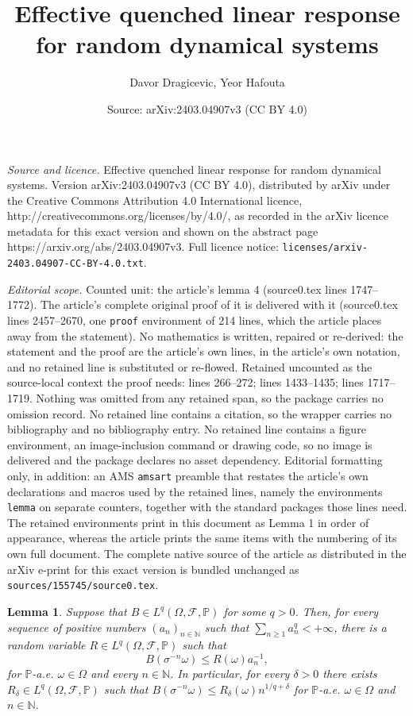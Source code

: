 \documentclass[10pt,a4paper]{amsart}
\title{Effective quenched linear response for random dynamical systems}
\author{Davor Dragicevic, Yeor Hafouta}
\date{Source: arXiv:2403.04907v3 (CC BY 4.0)}
\newtheorem{lemma}{Lemma}
\def\N{\mathbb{N}}
\def\om{\omega}
\begin{document}
\maketitle

\noindent\emph{Source and licence.} Effective quenched linear response for random dynamical systems. Version arXiv:2403.04907v3 (CC BY 4.0), distributed by arXiv under the Creative Commons Attribution 4.0 International licence, http://creativecommons.org/licenses/by/4.0/, as recorded in the arXiv licence metadata for this exact version and shown on the abstract page https://arxiv.org/abs/2403.04907v3. Full licence notice: \texttt{licenses/arxiv-2403.04907-CC-BY-4.0.txt}.\par\smallskip

\noindent\textit{Editorial scope.} Counted unit: the article's lemma 4 (source0.tex lines 1747--1772). The article's complete original proof of it is delivered with it (source0.tex lines 2457--2670, one \texttt{proof} environment of 214 lines, which the article places away from the statement). No mathematics is written, repaired or re-derived: the statement and the proof are the article's own lines, in the article's own notation, and no retained line is substituted or re-flowed.  Retained uncounted as the source-local context the proof needs: lines 266--272; lines 1433--1435; lines 1717--1719.  Nothing was omitted from any retained span, so the package carries no omission record.  No retained line contains a citation, so the wrapper carries no bibliography and no bibliography entry.  No retained line contains a figure environment, an image-inclusion command or drawing code, so no image is delivered and the package declares no asset dependency.  Editorial formatting only, in addition: an AMS \texttt{amsart} preamble that restates the article's own declarations and macros used by the retained lines, namely the environments \texttt{lemma} on separate counters, together with the standard packages those lines need.  The retained environments print in this document as Lemma 1 in order of appearance, whereas the article prints the same items with the numbering of its own full document.  The complete native source of the article as distributed in the arXiv e-print for this exact version is bundled unchanged as \texttt{sources/155745/source0.tex}.
\begin{lemma}\label{B lemma}
Suppose that  $B\in L^q(\Omega,\mathcal F,\mathbb P)$ for some $q>0$.  Then, for every sequence of positive numbers $(a_n)_{n\in \N}$ such that $\sum_{n\geq 1}a_n^q<+\infty$, there is a random variable $R\in L^q(\Omega,\mathcal F,\mathbb P)$ such that
\begin{equation}\label{BR}
B(\sigma^{-n}\omega)\leq R(\omega)a_n^{-1},
\end{equation}
for $\mathbb P$-a.e. $\omega \in \Omega$ and every $n\in \N$. In particular, for every $\delta>0$ there exists $R_\delta\in L^q(\Omega,\mathcal F,\mathbb P)$ such that $B(\sigma^{-n}\om)\leq R_\delta(\om)n^{1/q+\delta}$ for $\mathbb P$-a.e. $\om \in \Omega$ and $n\in \N$.
\end{lemma}
\end{document}
